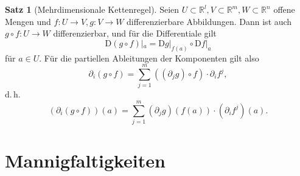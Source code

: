 \documentclass[a4paper]{scrreprt}
\numberwithin{equation}{chapter}
\newcommand{\DD}{\mathrm{D}}
\theoremstyle{definition}
\newtheorem{satz}[defn]{Satz}
\begin{document}
\begin{satz}[Mehrdimensionale Kettenregel]
	Seien $U \subset \mathbb R^l, V \subset \mathbb R^m, W \subset \mathbb R^n$ offene Mengen und $f\colon U\to V, g\colon V \to W$ differenzierbare Abbildungen. Dann ist auch $g\circ f\colon U \to W$ differenzierbar, und für die Differentiale gilt
	\[\DD(g\circ f)|_a = \DD g|_{f(a)} \circ \DD f|_a\]
	für $a \in U$. Für die partiellen Ableitungen der Komponenten gilt also
	\[\partial_i(g\circ f) = \sum_{j = 1}^m ((\partial_j g)\circ f) \cdot \partial_i f^j,\]
	d.\,h.
	\[(\partial_i(g\circ f))(a) = \sum_{j = 1}^m (\partial_j g)(f(a)) \cdot (\partial_i f^j)(a).\]
\end{satz}


\chapter{Mannigfaltigkeiten}
\end{document}
